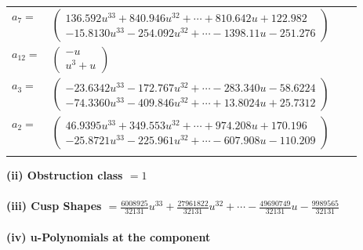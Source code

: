 \documentclass[1p]{elsarticle_modified}
\theoremstyle{definition}
\begin{document}
\begin{tabular}{m{7pt} m{180pt} m{7pt} m{180pt} }
\flushright $a_{7}=$&$\begin{pmatrix}136.592 u^{33}+840.946 u^{32}+\cdots+810.642 u+122.982\\-15.8130 u^{33}-254.092 u^{32}+\cdots-1398.11 u-251.276\end{pmatrix}$ \\
\flushright $a_{12}=$&$\begin{pmatrix}- u\\u^3+u\end{pmatrix}$ \\
\flushright $a_{3}=$&$\begin{pmatrix}-23.6342 u^{33}-172.767 u^{32}+\cdots-283.340 u-58.6224\\-74.3360 u^{33}-409.846 u^{32}+\cdots+13.8024 u+25.7312\end{pmatrix}$ \\
\flushright $a_{2}=$&$\begin{pmatrix}46.9395 u^{33}+349.553 u^{32}+\cdots+974.208 u+170.196\\-25.8721 u^{33}-225.961 u^{32}+\cdots-607.908 u-110.209\end{pmatrix}$\\&\end{tabular}
\flushleft \textbf{(ii) Obstruction class $= 1$}\\~\\
\flushleft \textbf{(iii) Cusp Shapes $= \frac{6008925}{32131} u^{33}+\frac{27961822}{32131} u^{32}+\cdots-\frac{49690749}{32131} u-\frac{9989565}{32131}$}\\~\\
\newpage\renewcommand{\arraystretch}{1}
\flushleft \textbf{(iv) u-Polynomials at the component}\newline \\
\end{document}
